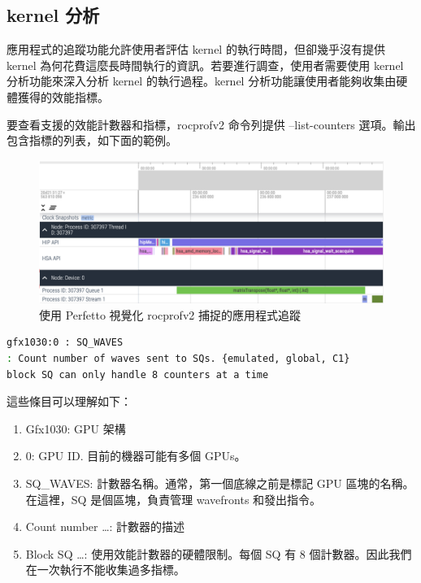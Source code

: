 \subsection{kernel 分析}

應用程式的追蹤功能允許使用者評估 kernel 的執行時間，但卻幾乎沒有提供 kernel 為何花費這麼長時間執行的資訊。若要進行調查，使用者需要使用 kernel 分析功能來深入分析 kernel 的執行過程。kernel 分析功能讓使用者能夠收集由硬體獲得的效能指標。

要查看支援的效能計數器和指標，rocprofv2 命令列提供 –list-counters 選項。輸出包含指標的列表，如下面的範例。

\begin{figure}
    \centering
    \includegraphics[width=1\linewidth]{FileAusiliari/Screenshots/Figure7-5.png}
    \caption{使用 Perfetto 視覺化 rocprofv2 捕捉的應用程式追蹤}
    \label{fig:captured application trace}
\end{figure}

\begin{lstlisting}[language=bash, caption={rocprofv2計數器的範例}, label={lst:rocprofv2 counter}]
gfx1030:0 : SQ_WAVES
: Count number of waves sent to SQs. {emulated, global, C1}
block SQ can only handle 8 counters at a time
\end{lstlisting}

這些條目可以理解如下：
\begin{enumerate}
    \item Gfx1030: GPU 架構
    \item 0: GPU ID. 目前的機器可能有多個 GPUs。
    \item SQ\_WAVES: 計數器名稱。通常，第一個底線之前是標記 GPU 區塊的名稱。在這裡，SQ 是個區塊，負責管理 wavefronts 和發出指令。
    \item Count number …: 計數器的描述
    \item Block SQ …: 使用效能計數器的硬體限制。每個 SQ 有 8 個計數器。因此我們在一次執行不能收集過多指標。
\end{enumerate}


